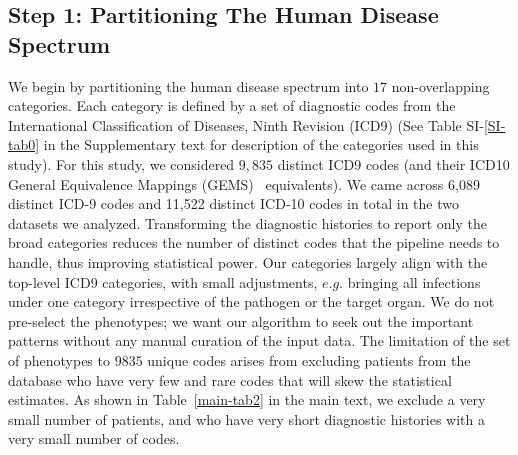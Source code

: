 \documentclass[3p,super,numbers,sort&compress,preprint,10pt]{elsarticle}
\begin{document}
\subsection{Step 1: Partitioning The Human Disease Spectrum}
We begin by partitioning the human disease spectrum into  $17$ non-overlapping  categories. Each category is defined by a set of diagnostic codes from the International Classification of Diseases, Ninth Revision (ICD9) (See  Table SI-\ref{SI-tab0} in the Supplementary text for description of  the categories used in this study). For this study, we considered $9,835$ distinct ICD9 codes (and their ICD10 General Equivalence Mappings (GEMS)~\cite{GEMS} equivalents). We came across 6,089 distinct ICD-9 codes and 11,522 distinct ICD-10 codes in total in the two datasets we analyzed. Transforming the diagnostic histories to report only the broad categories   reduces the number of distinct codes that the pipeline needs to handle, thus improving statistical  power.  %
% 
Our categories largely align with the top-level ICD9 categories, with small 
adjustments, $e.g.$ bringing all infections under one category irrespective of the pathogen or the target organ.
We do not pre-select the phenotypes; we want our algorithm to seek out the important patterns without any manual curation of the input data. The limitation of the set of phenotypes to $9835$ unique codes arises from excluding patients from the database who have very few and rare codes that will skew the statistical estimates. As shown in Table~\ref{main-tab2} in the main text, we exclude a very small number of patients, and who have  very short diagnostic histories with a very small number of codes.
\end{document}
